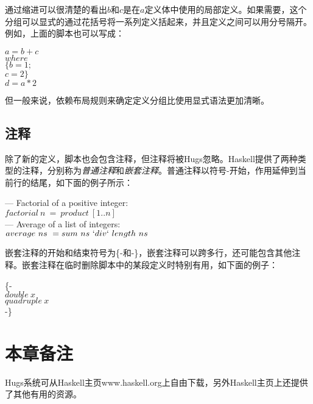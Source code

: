 通过缩进可以很清楚的看出$b$和$c$是在$a$定义体中使用的局部定义。如果需要，这个分组可以显式的通过花括号将一系列定义括起来，并且定义之间可以用分号隔开。例如，上面的脚本也可以写成：

\noindent\hspace*{1cm} $a = b + c$\\
\hspace*{2cm} $        where $\\
\hspace*{3cm} $            \{b = 1;$\\
\hspace*{3cm} $            c = 2\}$\\
\hspace*{1cm} $d = a * 2$

但一般来说，依赖布局规则来确定定义分组比使用显式语法更加清晰。

\subsection{注释}

除了新的定义，脚本也会包含注释，但注释将被Hugs忽略。Haskell提供了两种类型的注释，分别称为\textit{普通注释}和\textit{嵌套注释}。普通注释以符号-开始，作用延伸到当前行的结尾，如下面的例子所示：

\noindent\hspace*{1cm} — Factorial of a positive integer:\\
\hspace*{1cm} $factorial~n~=~product~[1 . . n ]$\\
\hspace*{1cm} — Average of a list of integers:\\
\hspace*{1cm} $average~ns~= sum~ns~`div`~length~ns$

嵌套注释的开始和结束符号为\{-和-\}，嵌套注释可以跨多行，还可能包含其他注释。嵌套注释在临时删除脚本中的某段定义时特别有用，如下面的例子：

\noindent\hspace*{1cm} \{-\\
\hspace*{1cm} $double~x$\\
\hspace*{1cm} $quadruple~x$\\
\hspace*{1cm} -\}

\section{本章备注}
Hugs系统可从Haskell主页www.haskell.org上自由下载，另外Haskell主页上还提供了其他有用的资源。

